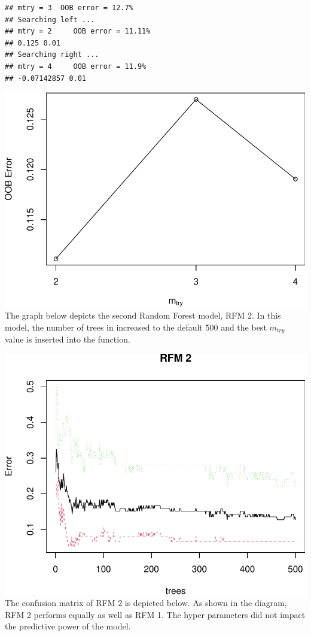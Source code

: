 \documentclass[11pt,preprint, authoryear]{elsarticle}
\numberwithin{equation}{section}
\numberwithin{figure}{section}
\numberwithin{table}{section}
\begin{document}
\begin{verbatim}
## mtry = 3  OOB error = 12.7% 
## Searching left ...
## mtry = 2     OOB error = 11.11% 
## 0.125 0.01 
## Searching right ...
## mtry = 4     OOB error = 11.9% 
## -0.07142857 0.01
\end{verbatim}

\includegraphics{ML_project_files/figure-latex/unnamed-chunk-9-1.pdf}
\newpage The graph below depicts the second Random Forest model, RFM 2.
In this model, the number of trees in increased to the default 500 and
the best \(m_{try}\) value is inserted into the function.

\includegraphics{ML_project_files/figure-latex/unnamed-chunk-10-1.pdf}
\newpage The confusion matrix of RFM 2 is depicted below. As shown in
the diagram, RFM 2 performs equally as well as RFM 1. The hyper
parameters did not impact the predictive power of the model.
\end{document}
